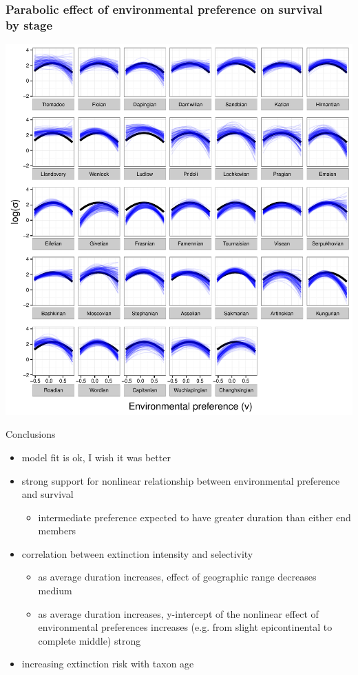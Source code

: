 \documentclass{beamer}
\begin{document}
\begin{frame}
  \frametitle{Parabolic effect of environmental preference on survival \\by stage}
  \begin{center}
    \includegraphics[width=\textwidth,height=0.8\textheight,keepaspectratio=true]{figure/env_cohort}
  \end{center}
\end{frame}

\begin{frame}
  \begin{block}{Conclusions}
    \begin{itemize}
      \item model fit is ok, I wish it was better
      \item strong support for nonlinear relationship between environmental preference and survival
        \begin{itemize}
          \item intermediate preference expected to have greater duration than either end members
        \end{itemize}
      \item correlation between extinction intensity and selectivity
        \begin{itemize}
          \item as average duration increases, effect of geographic range decreases \alert{medium}
          \item as average duration increases, y-intercept of the nonlinear effect of environmental preferences increases (e.g. from slight epicontinental to complete middle) \alert{strong}
        \end{itemize}
      \item increasing extinction risk with taxon age
    \end{itemize}
  \end{block}
\end{frame}
\end{document}
